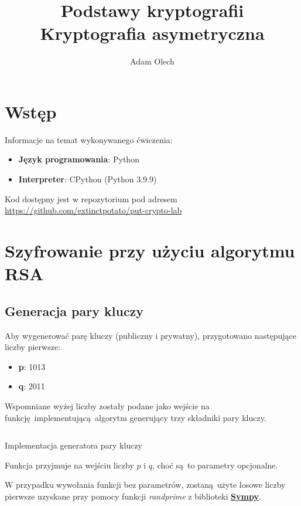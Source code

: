 \documentclass[12pt]{article}
\title{Podstawy kryptografii \\ \large Kryptografia asymetryczna}
\author{Adam Olech}
\begin{document}
\maketitle

\tableofcontents
\newpage

\section{Wstęp}

Informacje na temat wykonywanego ćwiczenia:

\begin{itemize}
	\item \textbf{Język programowania}: Python
	\item \textbf{Interpreter}: CPython (Python 3.9.9)
\end{itemize}

Kod dostępny jest w repozytorium pod adresem \url{https://github.com/extinctpotato/put-crypto-lab}

\section{Szyfrowanie przy użyciu algorytmu RSA}

\subsection{Generacja pary kluczy}

Aby wygenerować parę kluczy (publiczny i prywatny), 
przygotowano następujące liczby pierwsze:

\begin{itemize}
	\item \textbf{p}: 1013
	\item \textbf{q}: 2011
\end{itemize}

Wspomniane wyżej liczby zostały podane jako wejście na
funkcję implementującą algorytm generujący trzy składniki pary kluczy.

\begin{listing}[H]
	\inputminted[firstline=54,lastline=73]{python}{../rsa.py}
	\caption{Implementacja generatora pary kluczy}
\end{listing}

Funkcja przyjmuje na wejściu liczby $p$ i $q$, choć są to parametry opcjonalne.

W przypadku wywołania funkcji bez parametrów, zostaną użyte losowe liczby
pierwsze uzyskane przy pomocy funkcji 
\textit{randprime} z biblioteki \textbf{\href{https://www.sympy.org}{Sympy}}.
\end{document}
